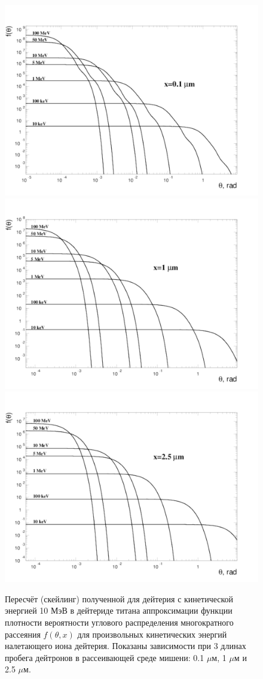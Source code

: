 \documentclass[a4paper,12pt]{article}
\begin{document}
\begin{large}
	
\begin{figure}[ht]
{
   \includegraphics[width=0.32\linewidth]{images/funtheta_0_1mkm_deuteron.pdf}
   \includegraphics[width=0.32\linewidth]{images/funtheta_1mkm_deuteron.pdf}
   \includegraphics[width=0.32\linewidth]{images/funtheta_2_5mkm_deuteron.pdf}
}
\caption{Пересчёт (скейлинг) полученной для дейтерия с кинетической энергией 10 МэВ в дейтериде титана аппроксимации функции плотности вероятности углового распределения многократного рассеяния $f(\theta,x)$ для произвольных кинетических энергий налетающего иона дейтерия.
	Показаны зависимости при 3 длинах пробега дейтронов в рассеивающей среде мишени: 0.1 $\mu$м, 1 $\mu$м и 2.5 $\mu$м.}
\label{fig:MFthetaScalingDeuteron}
\end{figure}


\end{large}
\end{document}
